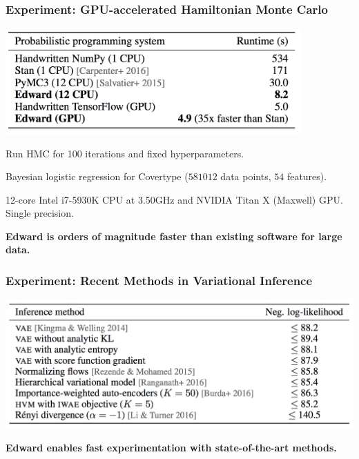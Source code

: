 \documentclass[10pt,
               xcolor={usenames,dvipsnames},
               hyperref={colorlinks,linktoc=all,citecolor=Plum,linkcolor=MidnightBlue,urlcolor=MidnightBlue},noamssymb]{beamer}
\begin{document}
\begin{frame}
\frametitle{Experiment: GPU-accelerated Hamiltonian Monte Carlo}
\begin{center}
\includegraphics[width=0.85\textwidth]{img/experiments_hmc.png}
\end{center}
\vspace{-1ex}
Run HMC for 100 iterations and fixed hyperparameters.

Bayesian logistic regression for Covertype ($581012$ data points, $54$
features).

12-core Intel i7-5930K CPU at 3.50GHz and NVIDIA Titan X (Maxwell) GPU.
Single precision.

\vspace{4ex}
\textbf{Edward is orders of magnitude faster than existing software
for large data.}
\end{frame}

\begin{frame}
\frametitle{Experiment: Recent Methods in Variational Inference}
\begin{center}
\includegraphics[height=0.4\textwidth]{img/experiments_vi.png}
\end{center}
\vspace{2ex}
\textbf{Edward enables fast experimentation with state-of-the-art methods.}
\end{frame}
\end{document}
